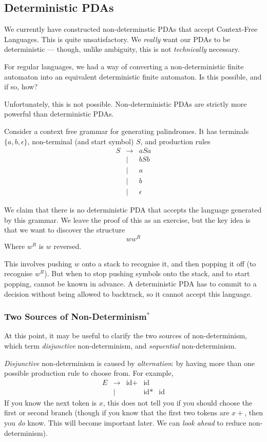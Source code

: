 \subsection{Deterministic PDAs}
We currently have constructed non-determinstic PDAs that accept Context-Free Languages. This is quite unsatisfactory. We \textit{really} want our PDAs to be deterministic --- though, unlike ambiguity, this is not \textit{technically} necessary.

For regular languages, we had a way of converting a non-deterministic finite automaton into an equivalent deterministic finite automaton. Is this possible, and if so, how?

Unfortunately, this is not possible. Non-deterministic PDAs are strictly more powerful than deterministic PDAs. 

Consider a context free grammar for generating palindromes. It has terminals $\{a, b, \epsilon \}$, non-terminal (and start symbol) $S$, and production rules
\[\begin{array}{rcl}
     S & \rightarrow & aSa  \\
     & \mid & bSb \\
     & \mid & a \\
     & \mid & b \\
     & \mid & \epsilon
\end{array}\]

We claim that there is no deterministic PDA that accepts the language generated by this grammar. We leave the proof of this as an exercise, but the key idea is that we want to discover the structure 
\[ w w^R\] 
Where $w^R$ is $w$ reversed.

This involves pushing $w$ onto a stack to recognise it, and then popping it off (to recognise $w^R$). But when to stop pushing symbols onto the stack, and to start popping, cannot be known in advance. A deterministic PDA has to commit to a decision without being allowed to backtrack, so it cannot accept this language. 

\subsubsection{Two Sources of Non-Determinism$^*$}
At this point, it may be useful to clarify the two sources of non-determinism, which \citet{krishnaswami-2019} term \textit{disjunctive} non-determinism, and \textit{sequential} non-determinism. 

\textit{Disjunctive} non-determinism is caused by \textit{alternation}: by having more than one possible production rule to choose from. For example, 
\[\begin{array}{rcl}
     E&\to&\text{id}+&\text{id}  \\
      &\mid&&\text{id}*&\text{id} 
\end{array}\]
If you know the next token is $x$, this does not tell you if you should choose the first or second branch (though if you know that the first two tokens are $x+$, then you \textit{do} know. This will become important later. We can \textit{look ahead} to reduce non-determinism).

